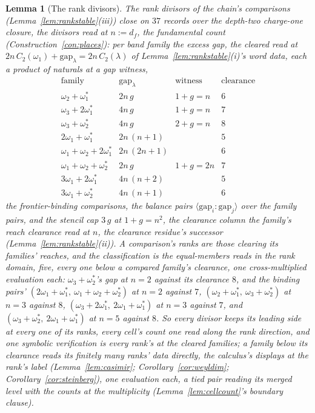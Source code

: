 \documentclass[11pt]{article}
\newtheorem{lemma}{Lemma}
\theoremstyle{definition}
\begin{document}
\begin{lemma}[The rank divisors]
\label{lem:chaininstances}
The rank divisors of the chain's
comparisons (Lemma~\ref{lem:rankstable}(iii)) close on $37$
records over the depth-two charge-one closure, the divisors read
at $n:=d_f$, the fundamental count
(Construction~\ref{con:places}): per band family the
\emph{excess gap}, the cleared read at
$2n\,C_2(\omega_1)+\mathrm{gap}_\lambda=2n\,C_2(\lambda)$ of
Lemma~\ref{lem:rankstable}(i)'s word data, each a product of
naturals at a gap witness,
\[
\begin{array}{llll}
\text{family} & \mathrm{gap}_\lambda & \text{witness} & \text{clearance}\\
\hline
\omega_2+\omega_1^* & 2n\,g & 1+g=n & 6\\
\omega_3+2\omega_1^* & 4n\,g & 1+g=n & 7\\
\omega_3+\omega_2^* & 4n\,g & 2+g=n & 8\\
2\omega_1+\omega_1^* & 2n\,(n+1) & & 5\\
\omega_1{+}\omega_2+2\omega_1^* & 2n\,(2n+1) & & 6\\
\omega_1{+}\omega_2+\omega_2^* & 2n\,g & 1+g=2n & 7\\
3\omega_1+2\omega_1^* & 4n\,(n+2) & & 5\\
3\omega_1+\omega_2^* & 4n\,(n+1) & & 6
\end{array}
\]
the frontier-binding comparisons, the balance pairs
$\langle\mathrm{gap}_i\!:\!\mathrm{gap}_j\rangle$ over the family
pairs, and the stencil cap $3\,g$ at $1+g=n^2$, the clearance
column the family's reach clearance read at $n$, the clearance
residue's successor
(Lemma~\ref{lem:rankstable}(ii)). A comparison's ranks are those
clearing its families' reaches, and the \emph{classification} is
the equal-members
reads in the rank domain, five, every one below a compared
family's clearance, one cross-multiplied evaluation each:
$\omega_3{+}\omega_2^*$'s gap at $n=2$ against its clearance $8$,
and the binding pairs'
$(2\omega_1{+}\omega_1^*,\ \omega_1{+}\omega_2{+}\omega_2^*)$ at
$n=2$ against $7$,
$(\omega_2{+}\omega_1^*,\ \omega_3{+}\omega_2^*)$ at $n=3$ against
$8$,
$(\omega_3{+}2\omega_1^*,\ 2\omega_1{+}\omega_1^*)$ at $n=3$
against $7$, and
$(\omega_3{+}\omega_2^*,\ 2\omega_1{+}\omega_1^*)$ at $n=5$
against $8$. So every divisor keeps its
leading side at every one of its ranks, every cell's count one
read along the rank direction, and one symbolic verification is
every rank's at the
cleared families; a family below its clearance reads its finitely
many ranks' data directly, the calculus's displays at the rank's
label (Lemma~\ref{lem:casimir};
Corollary~\ref{cor:weyldim}; Corollary~\ref{cor:steinberg}), one
evaluation each, a tied pair reading its merged level with the
counts at the multiplicity (Lemma~\ref{lem:cellcount}'s boundary
clause).

\end{lemma}
\end{document}
